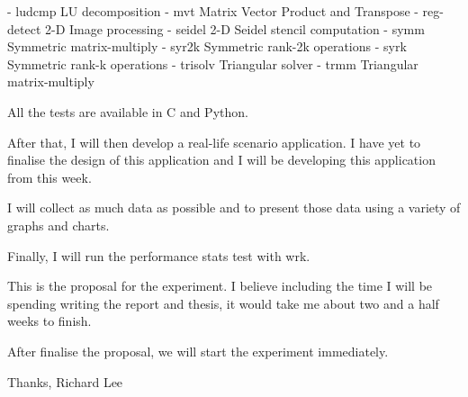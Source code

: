 - ludcmp	LU decomposition\newline
- mvt	Matrix Vector Product and Transpose\newline
- reg-detect	2-D Image processing\newline
- seidel	2-D Seidel stencil computation\newline
- symm	Symmetric matrix-multiply\newline
- syr2k	Symmetric rank-2k operations\newline
- syrk	Symmetric rank-k operations\newline
- trisolv	Triangular solver\newline
- trmm	Triangular matrix-multiply\newline

All the tests are available in C and Python.

After that, I will then develop a real-life scenario application. I have yet to finalise the design of this application and I will be developing this application from this week.

I will collect as much data as possible and to present those data using a variety of graphs and charts.

Finally, I will run the performance stats test with wrk.

This is the proposal for the experiment. I believe including the time I will be spending writing the report and thesis, it would take me about two and a half weeks to finish.

After finalise the proposal, we will start the experiment immediately.

Thanks,\newline
Richard Lee
